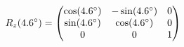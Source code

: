 \documentclass[preview]{standalone}
\begin{document}
\begin{align*}
\special{dvisvgm:raw <g id='unique000'>}R_z(4.6^\circ) = \begin{pmatrix} \cos(4.6^\circ) & -\sin(4.6^\circ) & 0 \\ \sin(4.6^\circ) & \cos(4.6^\circ) & 0 \\ 0 & 0 & 1 \end{pmatrix}\special{dvisvgm:raw </g>}
\end{align*}
\end{document}
